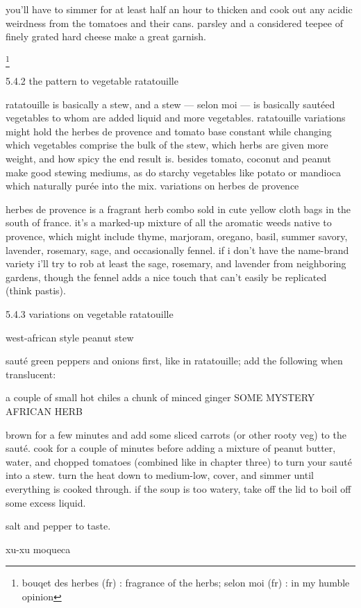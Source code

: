 you'll have to simmer for at least half an hour to thicken and cook out any acidic weirdness from the tomatoes and their cans. parsley and a considered teepee of finely grated hard cheese make a great garnish.

\footnote{bouqet des herbes (fr) : fragrance of the herbs;  selon moi (fr) : in my humble opinion}

5.4.2  the pattern to vegetable ratatouille

ratatouille is basically a stew, and a stew --- selon moi --- is basically saut\'{e}ed vegetables to whom are added liquid and more vegetables. ratatouille variations might hold the herbes de provence and tomato base constant while changing which vegetables comprise the bulk of the stew, which herbs are given more weight, and how spicy the end result is. besides tomato, coconut and peanut make good stewing mediums, as do starchy vegetables like potato or mandioca which naturally pur\'{e}e into the mix. 
variations on herbes de provence

herbes de provence is a fragrant herb combo sold in cute yellow cloth bags in the south of france. it's a marked-up mixture of all the aromatic weeds native to provence, which might include thyme, marjoram, oregano, basil, summer savory, lavender, rosemary, sage, and occasionally fennel. if i don't have the name-brand variety i'll try to rob at least the sage, rosemary, and lavender from neighboring gardens, though the fennel adds a nice touch that can't easily be replicated (think pastis).


5.4.3 variations on vegetable ratatouille

west-african style peanut stew

saut\'{e} green peppers and onions first, like in ratatouille; add the following when translucent:

	a couple of small hot chiles
	a chunk of minced ginger
	SOME MYSTERY AFRICAN HERB
	
brown for a few minutes and add some sliced carrots (or other rooty veg) to the saut\'{e}. cook for a couple of minutes before adding a mixture of peanut butter, water, and chopped tomatoes (combined like in chapter three) to turn your saut\'{e} into a stew. turn the heat down to medium-low, cover, and simmer until everything is cooked through. if the soup is too watery, take off the lid to boil off some excess liquid.

salt and pepper to taste.

xu-xu moqueca

